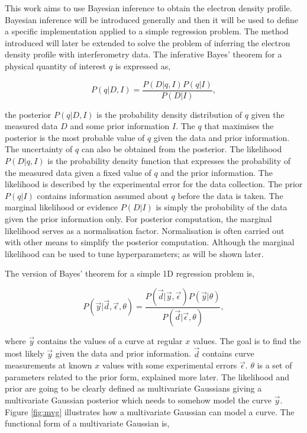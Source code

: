 This work aims to use Bayesian inference to obtain the electron density profile. Bayesian inference will be introduced generally and then it will be used to define a specific implementation applied to a simple regression problem. The method introduced will later be extended to solve the problem of inferring the electron density profile with interferometry data. The inferative Bayes' theorem for a physical quantity of interest $q$ is expressed as,

\begin{equation}
P(q|D,I) = \frac{P(D|q,I) P(q|I)}{P(D|I)},
\label{eq:bayesth}
\end{equation}

\noindent the posterior $P(q|D,I)$ is the probability density distribution of $q$ given the measured data $D$ and some prior information $I$. The $q$ that maximises the posterior is the most probable value of $q$ given the data and prior information. The uncertainty of $q$ can also be obtained from the posterior. The likelihood $P(D|q,I)$ is the probability density function that expresses the probability of the measured data given a fixed value of $q$ and the prior information. The likelihood is described by the experimental error for the data collection. The prior $P(q|I)$ contains information assumed about $q$ before the data is taken. The marginal likelihood or evidence $P(D|I)$ is simply the probability of the data given the prior information only. For posterior computation, the marginal likelihood serves as a normalisation factor. Normalisation is often carried out with other means to simplify the posterior computation. Although the marginal likelihood can be used to tune hyperparameters; as will be shown later.

The version of Bayes' theorem for a simple 1D regression problem is,

\begin{equation} 
  P(\vec{y}|\vec{d},\vec \epsilon, \theta) = \frac{P(\vec{d}|\vec{y},\vec \epsilon) P(\vec y|\theta)}{P(\vec d|\vec \epsilon, \theta)},
  \label{eq:bayesth_simple_regression}
\end{equation}

\noindent where $\vec y$ contains the values of a curve at regular $x$ values. The goal is to find the most likely $\vec y$ given the data and prior information. $\vec d$ contains curve measurements at known $x$ values with some experimental errors $\vec \epsilon$. $\theta$ is a set of parameters related to the prior form, explained more later. The likelihood and prior are going to be clearly defined as multivariate Gaussians giving a multivariate Gaussian posterior which needs to somehow model the curve $\vec y$. Figure \ref{fig:mvg} illustrates how a multivariate Gaussian can model a curve. The functional form of a multivariate Gaussian is,

